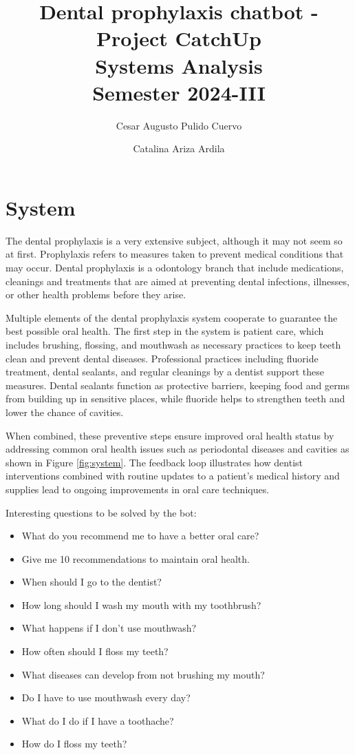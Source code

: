 \documentclass[12pt]{article}
\title{Dental prophylaxis chatbot - Project CatchUp \\ \large Systems Analysis \\ \large Semester 2024-III}
\author{Cesar Augusto Pulido Cuervo \and Catalina Ariza Ardila}
\date{}
\begin{document}
\maketitle

\section*{System}

The dental prophylaxis is a very extensive subject, although it may not seem so at first. Prophylaxis refers to measures taken to prevent medical conditions that may occur. Dental prophylaxis is a odontology branch that include medications, cleanings and treatments that are aimed at preventing dental infections, illnesses, or other health problems before they arise.

Multiple elements of the dental prophylaxis system cooperate to guarantee the best possible oral health. The first step in the system is patient care, which includes brushing, flossing, and mouthwash as necessary practices to keep teeth clean and prevent dental diseases. Professional practices including fluoride treatment, dental sealants, and regular cleanings by a dentist support these measures. Dental sealants function as protective barriers, keeping food and germs from building up in sensitive places, while fluoride helps to strengthen teeth and lower the chance of cavities.

When combined, these preventive steps ensure improved oral health status by addressing common oral health issues such as periodontal diseases and cavities as shown in Figure \ref{fig:system}. The feedback loop illustrates how dentist interventions combined with routine updates to a patient's medical history and supplies lead to ongoing improvements in oral care techniques.

Interesting questions to be solved by the bot:

\begin{itemize}
    \item What do you recommend me to have a better oral care?
    \item Give me 10 recommendations to maintain oral health.
    \item When should I go to the dentist?
    \item How long should I wash my mouth with my toothbrush?
    \item What happens if I don't use mouthwash?
    \item How often should I floss my teeth?
    \item What diseases can develop from not brushing my mouth?
    \item Do I have to use mouthwash every day?
    \item What do I do if I have a toothache?
    \item How do I floss my teeth?
\end{itemize}
\end{document}
